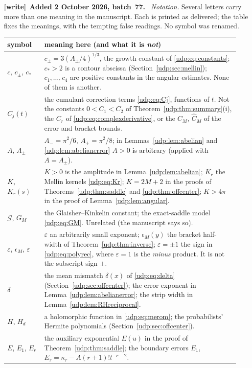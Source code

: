 \documentclass[11pt]{article}
\theoremstyle{remark}\newtheorem{remark}[theorem]{Remark}
\newcommand{\eps}{\varepsilon}
\newcommand{\Gla}{\mathcal G}
\newenvironment{writenote}[1][]{\par\smallskip\begingroup\small
 \noindent\textbf{[write]}\if\relax\detokenize{#1}\relax\else~\textbf{#1.}\fi\ }%
 {\par\endgroup\smallskip}
\numberwithin{equation}{section}
\begin{document}
\begin{writenote}[Added 2 October 2026, batch~77]
\emph{Notation.} Several letters carry more than one meaning in the
manuscript. Each is printed as delivered; the table fixes the meanings, with
the tempting false readings. No symbol was renamed.
\begin{center}\footnotesize
\begin{tabular}{@{}p{0.15\linewidth}p{0.79\linewidth}@{}}
\toprule
symbol & meaning here (and what it is \emph{not})\\
\midrule
$c$, $c_\pm$, $c_*$ & $c_\pm=3(A_\pm/4)^{1/3}$, the growth constant of \eqref{udp:eq:constants}; $c_*>2$ is a contour abscissa (Section~\ref{udp:sec:mellin}); $c_1,\dots,c_4$ are positive constants in the angular estimates. None of them is another.\\
$C_j(t)$ & the cumulant correction terms \eqref{udp:eq:Cj}, functions of $t$. Not the constants $0<C_1<C_2$ of Theorem~\ref{udp:thm:summary}(i), the $C_r$ of \eqref{udp:eq:complexderivative}, or the $C_M$, $\widehat C_M$ of the error and bracket bounds.\\
$A$, $A_\pm$ & $A_-=\pi^2/6$, $A_+=\pi^2/8$; in Lemmas~\ref{udp:lem:abelian} and \ref{udp:lem:abelianerror} $A>0$ is arbitrary (applied with $A=A_\pm$).\\
$K$, $K_r(s)$ & $K>0$ is the amplitude in Lemma~\ref{udp:lem:abelian}; $K_r$ the Mellin kernels \eqref{udp:eq:Kr}; $K=2M+2$ in the proofs of Theorems~\ref{udp:thm:saddle} and \ref{udp:thm:offcenter}; $K>4\pi$ in the proof of Lemma~\ref{udp:lem:angular}.\\
$\Gla$, $G_M$ & the Glaisher--Kinkelin constant; the exact-saddle model \eqref{udp:eq:GM}. Unrelated (the manuscript says so).\\
$\eps$, $\epsilon_M$, $\varepsilon$ & $\eps$ an arbitrarily small exponent; $\epsilon_M(y)$ the bracket half-width of Theorem~\ref{udp:thm:inverse}; $\varepsilon=\pm1$ the sign in \eqref{udp:eq:polyrec}, where $\varepsilon=1$ is the \emph{minus} product. It is not the subscript sign $\pm$.\\
$\delta$ & the mean mismatch $\delta(x)$ of \eqref{udp:eq:delta} (Section~\ref{udp:sec:offcenter}); the error exponent in Lemma~\ref{udp:lem:abelianerror}; the strip width in Lemma~\ref{udp:lem:RHreciprocal}.\\
$H$, $H_d$ & a holomorphic function in \eqref{udp:eq:merom}; the probabilists' Hermite polynomials (Section~\ref{udp:sec:offcenter}).\\
$E$, $E_1$, $E_r$ & the auxiliary exponential $E(u)$ in the proof of Theorem~\ref{udp:thm:saddle}; the boundary errors $E_1$, $E_r=\kappa_r-A(r+1)!t^{-r-2}$.\\

\end{tabular}
\end{center}
\end{writenote}
\end{document}

